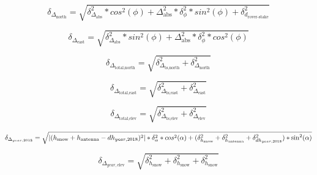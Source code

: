 \begin{equation}
	\delta_{\Delta_{\text{north}}} = \sqrt{\delta_{\Delta_{\text{abs}}}^2 * cos^2(\phi) + \Delta_{\text{abs}}^2 * \delta_{\phi}^2 * sin^2(\phi) + \delta_{d_{\text{rover-stake}}}^2}
\end{equation}

\begin{equation}
	\delta_{\Delta_{\text{east}}} = \sqrt{\delta_{\Delta_{\text{abs}}}^2 * sin^2(\phi) + \Delta_{\text{abs}}^2 * \delta_{\phi}^2 * cos^2(\phi)}
\end{equation}

\begin{equation}
	\delta_{\Delta_{\text{total,north}}} = \sqrt{\delta_{\Delta_{\text{ts,north}}}^2 + \delta_{\Delta_{\text{north}}}^2}
\end{equation}

\begin{equation}
	\delta_{\Delta_{\text{total,east}}} = \sqrt{\delta_{\Delta_{\text{ts,east}}}^2 + \delta_{\Delta_{\text{east}}}^2}
\end{equation}

\begin{equation}
	\delta_{\Delta_{\text{total,elev}}} = \sqrt{\delta_{\Delta_{\text{ts,elev}}}^2 +\delta_{\Delta_{\text{elev}}}^2}
\end{equation}

\begin{equation}
\delta_{\Delta_{year,2018}} = \sqrt{\left|(h_{\text{snow}} + h_{\text{antenna}} - dh_{year,2018})^2\right| * \delta_{\alpha}^2 * cos^2(\alpha)\\
+ (\delta_{h_{\text{snow}}}^2 + \delta_{h_{\text{antenna}}}^2 + \delta_{dh_{year,2018}}^2) * \sin^2(\alpha)}
\end{equation}

\begin{equation}
	\delta_{\Delta_{year, \text{elev}}} = \sqrt{\delta_{h_{\text{snow}}}^2 + \delta_{h_{\text{snow}}}^2 + \delta_{h_{\text{snow}}}^2}
\end{equation}

